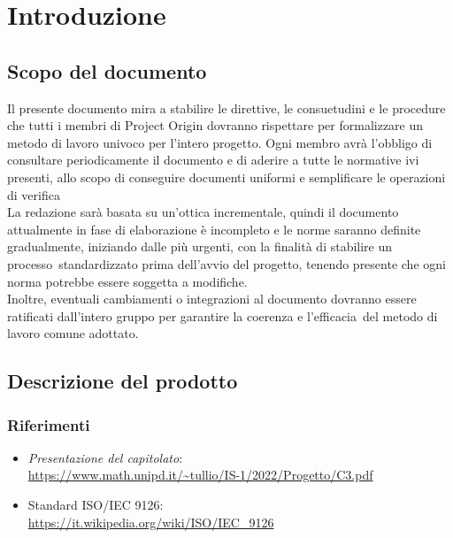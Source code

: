 \section{Introduzione}

\subsection{Scopo del documento}
Il presente documento mira a stabilire le direttive, le consuetudini e le procedure che tutti i membri di Project Origin dovranno rispettare per formalizzare un metodo di lavoro 
univoco per l'intero progetto. Ogni membro avrà l'obbligo di consultare periodicamente il documento e di aderire a tutte le normative ivi presenti, allo scopo di conseguire 
documenti uniformi e semplificare le operazioni di verifica\glo\. \\ La redazione sarà basata su un'ottica incrementale, quindi il documento attualmente in fase di elaborazione è 
incompleto e le norme saranno definite gradualmente, iniziando dalle più urgenti, con la finalità di stabilire un processo\glo\ standardizzato prima dell'avvio del progetto, 
tenendo presente che ogni norma potrebbe essere soggetta a modifiche. \\ Inoltre, eventuali cambiamenti o integrazioni al documento dovranno essere ratificati dall’intero 
gruppo per garantire la coerenza e l'efficacia\glo\ del metodo di lavoro comune adottato.


\subsection{Descrizione del prodotto}

\subsubsection{Riferimenti}
\begin{itemize}
    \item \textit{Presentazione del capitolato}: \\ \url{https://www.math.unipd.it/~tullio/IS-1/2022/Progetto/C3.pdf}
    \item Standard ISO/IEC 9126\glo: \\ \url{https://it.wikipedia.org/wiki/ISO/IEC_9126}  
\end{itemize}
